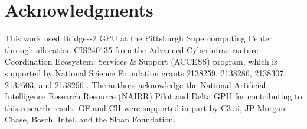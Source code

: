 \section*{Acknowledgments}
This work used Bridges-2 GPU at the Pittsburgh Supercomputing Center through allocation CIS240135 from the Advanced Cyberinfrastructure Coordination Ecosystem: Services \& Support (ACCESS) program, which is supported by National Science Foundation grants 2138259, 2138286, 2138307, 2137603, and 2138296 \cite{boerner2023access}.
The authors acknowledge the National Artificial Intelligence Research Resource (NAIRR) Pilot and Delta GPU for contributing to this research result.
GF and CH were supported in part by C3.ai, JP Morgan Chase, Bosch, Intel, and the Sloan Foundation. 
